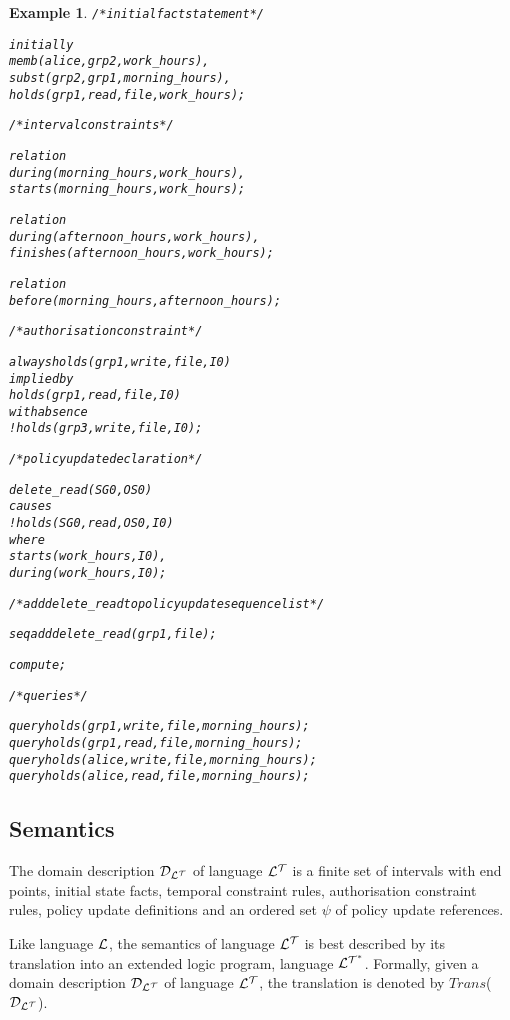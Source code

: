 \documentclass[11pt]{report}
\newtheorem{vexample}{Example}[chapter]
\newenvironment{vverbatim}
{
  \begin{alltt}
}
{
    \vspace{-\baselineskip}
  \end{alltt}
}
\begin{document}
\begin{vexample}
\begin{vverbatim}
  /* initial fact statement */

  initially
    memb(alice, grp2, work\_hours),
    subst(grp2, grp1, morning\_hours),
    holds(grp1, read, file, work\_hours);

  /* interval constraints */

  relation
    during(morning\_hours, work\_hours),
    starts(morning\_hours, work\_hours);

  relation
    during(afternoon\_hours, work\_hours),
    finishes(afternoon\_hours, work\_hours);

  relation
    before(morning\_hours, afternoon\_hours);

  /* authorisation constraint */

  always holds(grp1, write, file, I0)
    implied by
      holds(grp1, read, file, I0)
    with absence
      !holds(grp3, write, file, I0);

  /* policy update declaration */

  delete\_read(SG0, OS0)
    causes
      !holds(SG0, read, OS0, I0)
    where
      starts(work\_hours, I0),
      during(work\_hours, I0);

  /* add delete\_read to policy update sequence list */

  seq add delete\_read(grp1, file);

  compute;

  /* queries */

  query holds(grp1, write, file, morning\_hours);
  query holds(grp1, read, file, morning\_hours);
  query holds(alice, write, file, morning\_hours);
  query holds(alice, read, file, morning\_hours);
          \end{vverbatim}
        \end{vexample}

      \subsection{Semantics}
        \label{subs-tempo-seman}

        The domain description ${\cal D_{L^T}}$ of language ${\cal L^T}$ is
        a finite set of intervals with end points, initial state facts,
        temporal constraint rules, authorisation constraint rules, policy
        update definitions and an ordered set $\psi$ of policy update
        references.

        Like language ${\cal L}$, the semantics of language ${\cal L^T}$ is
        best described by its translation into an extended logic program,
        language ${\cal L^{T^*}}$. Formally, given a domain description
        ${\cal D_{L^T}}$ of language ${\cal L^T}$, the translation is denoted
        by $Trans$(${\cal D_{L^T}}$).
\end{document}
